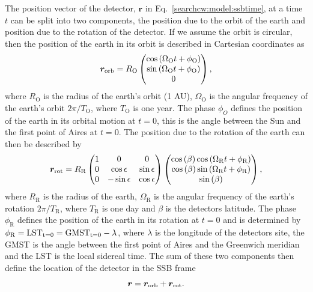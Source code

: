 The position vector of the detector,
$\bm{r}$ in Eq.~\ref{searchcw:model:ssbtime}, at a time $t$ can be split into two components,
the position due to the orbit of the earth and position due to the rotation of
the detector.
If we assume the orbit is circular, then the position of the earth in its orbit
is described in Cartesian coordinates as
%
\begin{equation}
    \bm{r}_{\rm{orb}} = R_{\mathrm{O}}
    \left(
    \begin{matrix}
        \cos{\left( \Omega_{\mathrm{O}} t + \phi_{\mathrm{O}}  \right)}  \\
        \sin{\left( \Omega_{\mathrm{O}} t + \phi_{\mathrm{O}}  \right)} \\
        0 \\
    \end{matrix} \right),
\end{equation}
%
where $R_{\mathrm{O}}$ is the radius of the earth's orbit (1 AU),
$\Omega_{\mathrm{O}}$ is the angular frequency of the earth's orbit
$2\pi/T_{\mathrm{O}}$, where $T_{\mathrm{O}}$ is one year. The phase $\phi_{O}$ defines the position of the earth in its orbital motion at $t=0$, this is the angle between the Sun and the first point of Aires at $t=0$.  The
position due to the rotation of the earth can then be described by 
%
\begin{equation}
    \bm{r}_{\rm{rot}} = R_{\mathrm{R}}
    \left(
    \begin{matrix}
        1 & 0 & 0  \\
        0 & \cos \epsilon & \sin \epsilon \\
        0 & -\sin \epsilon & \cos \epsilon \\
    \end{matrix} \right)
    \left(
    \begin{matrix}
        \cos{(\beta)}\cos{\left( \Omega_{\mathrm{R}} t + \phi_{\mathrm{R}}  \right)}  \\
        \cos{(\beta)}\sin{\left( \Omega_{\mathrm{R}} t + \phi_{\mathrm{R}}  \right)} \\
        \sin{(\beta)} \\
    \end{matrix} \right),
\end{equation}
%
where $R_{\mathrm{R}}$ is the radius of the earth, $\Omega_{\mathrm{R}}$ is the
angular frequency of the earth's rotation $2\pi/T_{\mathrm{R}}$, where
$T_{\mathrm{R}}$ is one day and $\beta$ is the detectors latitude. The phase $\phi_{\mathrm{R}}$ defines the position of the earth in its rotation at $t=0$ and is determined by $\phi_{\mathrm{R}} = \rm{LST}_{t=0} = \rm{GMST}_{t=0} - \lambda$, where $\lambda$  is the longitude of
the detectors site, the \gls{GMST} is the angle between the first point of Aires and the Greenwich meridian and the LST is the local sidereal time. The sum of these two components
then define the location of the detector in the \gls{SSB} frame
%
\begin{equation}
    \bm{r} = \bm{r}_{\rm{orb}} + \bm{r}_{\rm{rot}}.
\end{equation}

